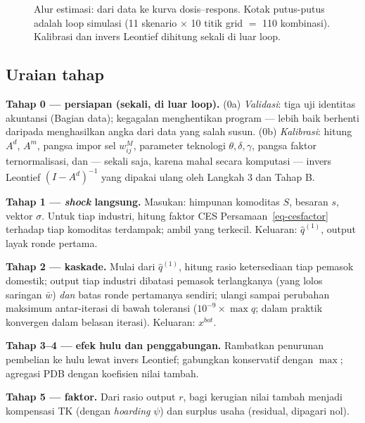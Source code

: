 \documentclass[
  manuscript=article,
  layout=publish,
  year=2026,
  volume=1,
]{den}
\begin{document}
\begin{figure}[p]
{%
}
\caption{Alur estimasi: dari data ke kurva dosis--respons. Kotak putus-putus
adalah loop simulasi (11 skenario $\times$ 10 titik grid $=$ 110 kombinasi).
Kalibrasi dan invers Leontief dihitung sekali di luar loop.}
\label{fig:flow}
\end{figure}

\subsection{Uraian tahap}\label{uraian-tahap}

\textbf{Tahap 0 --- persiapan (sekali, di luar loop).} (0a)
\emph{Validasi}: tiga uji identitas akuntansi (Bagian data); kegagalan
menghentikan program --- lebih baik berhenti daripada menghasilkan angka
dari data yang salah susun. (0b) \emph{Kalibrasi}: hitung \(A^d\),
\(A^m\), pangsa impor sel \(w^M_{ij}\), parameter teknologi
\(\theta, \delta, \gamma\), pangsa faktor ternormalisasi, dan --- sekali
saja, karena mahal secara komputasi --- invers Leontief
\((I - A^d)^{-1}\) yang dipakai ulang oleh Langkah 3 dan Tahap B.

\textbf{Tahap 1 --- \emph{shock} langsung.} Masukan: himpunan komoditas
\(S\), besaran \(s\), vektor \(\sigma\). Untuk tiap industri, hitung
faktor CES Persamaan~\ref{eq-cesfactor} terhadap tiap komoditas
terdampak; ambil yang terkecil. Keluaran: \(\hat q^{(1)}\), output layak
ronde pertama.

\textbf{Tahap 2 --- kaskade.} Mulai dari \(\hat q^{(1)}\), hitung rasio
ketersediaan tiap pemasok domestik; output tiap industri dibatasi
pemasok terlangkanya (yang lolos saringan \(\bar w\)) \emph{dan} batas
ronde pertamanya sendiri; ulangi sampai perubahan maksimum antar-iterasi
di bawah toleransi (\(10^{-9} \times \max q\); dalam praktik konvergen
dalam belasan iterasi). Keluaran: \(x^{bot}\).

\textbf{Tahap 3--4 --- efek hulu dan penggabungan.} Rambatkan penurunan
pembelian ke hulu lewat invers Leontief; gabungkan konservatif dengan
\(\max\); agregasi PDB dengan koefisien nilai tambah.

\textbf{Tahap 5 --- faktor.} Dari rasio output \(r\), bagi kerugian
nilai tambah menjadi kompensasi TK (dengan \emph{hoarding} \(\psi\)) dan
surplus usaha (residual, dipagari nol).
\end{document}
